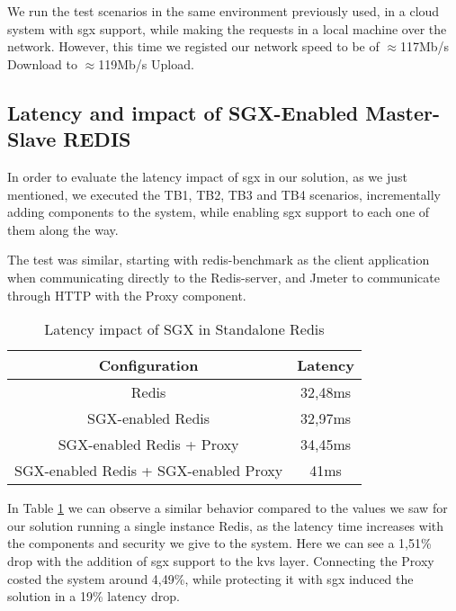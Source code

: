 We run the test scenarios in the same environment previously used, in a cloud system with \gls{sgx} support, while making the requests in a local machine over the network. However, this time we registed  our network speed to be of $\approx$117Mb/s Download to $\approx$119Mb/s Upload.


\subsection{Latency and impact of SGX-Enabled Master-Slave REDIS}

In order to evaluate the latency impact of \gls{sgx} in our solution, as we just mentioned, we executed the TB1, TB2, TB3 and TB4 scenarios, incrementally adding components to the system, while enabling \gls{sgx} support to each one of them along the way. 

The test was similar, starting with redis-benchmark as the client application when communicating directly to the Redis-server, and Jmeter to communicate through HTTP with the Proxy component.

\begin{table}[ht]
	\caption{Latency impact of SGX in Standalone Redis} %
	\centering %
	\begin{tabular}{c c} %
		\hline\hline %
		\textbf{Configuration} & \textbf{Latency} \\ [0.5ex] %
		\hline
		Redis & 32,48ms\\
		\hline
		SGX-enabled Redis & 32,97ms \\
		\hline
		SGX-enabled Redis + Proxy & 34,45ms \\
		\hline %
		SGX-enabled Redis + SGX-enabled Proxy & 41ms\\ [1ex] %
		\hline %
	\end{tabular}
	\label{table:latencyMasterSlaveRedis} %
\end{table}

In Table \ref{table:latencyMasterSlaveRedis} we can observe a similar behavior compared to the values we saw for our solution running a single instance Redis, as the latency time increases with the components and security we give to the system. Here we can see a 1,51\% drop with the addition of \gls{sgx} support to the \gls{kvs} layer. Connecting the Proxy costed the system around 4,49\%, while protecting it with \gls{sgx} induced the solution in a 19\% latency drop.

